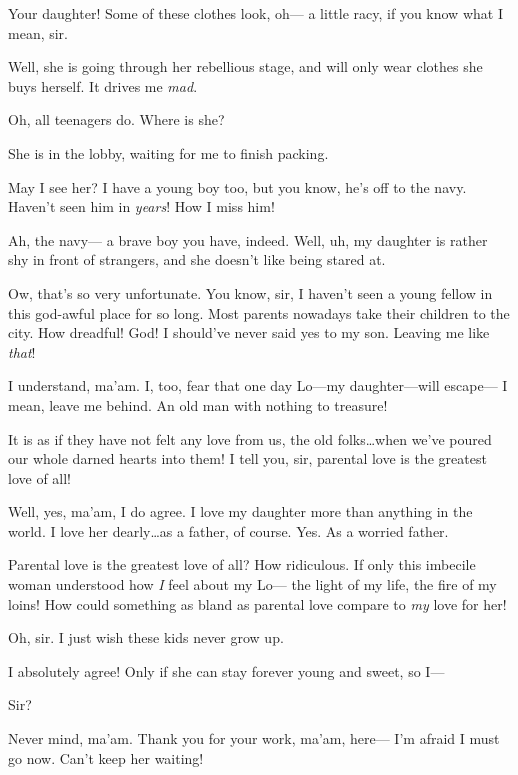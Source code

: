 \documentclass[letterpaper,12pt]{article}
\begin{document}
\custodian%
Your daughter! Some of these clothes look, oh--- a little racy, if you know what I mean, sir.

\hum[chuckling]
Well, she is going through her rebellious stage, and will only wear clothes she buys herself. It drives me \textit{mad}.

\custodian%
Oh, all teenagers do. Where is she?

\hum%
She is in the lobby, waiting for me to finish packing.

\custodian%
May I see her? I have a young boy too, but you know, he's off to the navy. Haven't seen him in \textit{years}! How I miss him!

\hum%
Ah, the navy--- a brave boy you have, indeed. Well, uh, my daughter is rather shy in front of strangers, and she doesn't like being stared at.

\custodian%
Ow, that's so very unfortunate. You know, sir, I haven't seen a young fellow in this god-awful place for so long. Most parents nowadays take their children to the city. How dreadful! God! I should've never said yes to my son. Leaving me like \textit{that}!

\hum%
I understand, ma'am. I, too, fear that one day Lo---my daughter---will escape--- I mean, leave me behind. An old man with nothing to treasure!

\custodian%
It is as if they have not felt any love from us, the old folks\dots when we've poured our whole darned hearts into them! I tell you, sir, parental love is the greatest love of all! 

\hum%
Well, yes, ma'am, I do agree. I love my daughter more than anything in the world. I love her dearly\dots as a father, of course. Yes. As a worried father. 

\hum%
Parental love is the greatest love of all? How ridiculous. If only this imbecile woman understood how \textit{I} feel about my Lo--- the light of my life, the fire of my loins! How could something as bland as parental love compare to \textit{my} love for her!

\custodian%
Oh, sir. I just wish these kids never grow up.

\hum%
I absolutely agree! Only if she can stay forever young and sweet, so I--- 

\custodian%
Sir?

Never mind, ma'am. Thank you for your work, ma'am, here---  I'm afraid I must go now. Can't keep her waiting!
\end{document}
